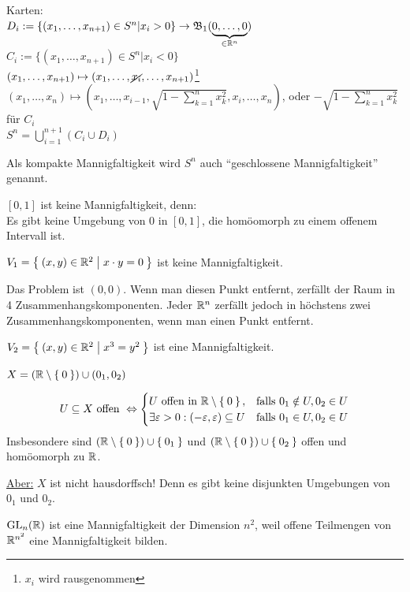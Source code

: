 \begin{beispiel}[Mannigfaltigkeiten]
\begin{bspenum}
              Karten: \\
              $D_i := \{(x_1, \dots, x_{n+1}) \in S^n | x_i > 0\} \rightarrow \mathfrak{B}_1 (\underbrace{0, \dots, 0}_{\in \mathbb{R}^n})$\\
              $C_i := \{(x_1, \dots, x_{n+1}) \in S^n | x_i < 0\}$\\
              $(x_1, \dots, x_{n+1}) \mapsto (x_1, \dots, \cancel{x_i}, \dots, x_{n+1})$\footnote{$x_i$ wird rausgenommen}\\
              $(x_1, \dots, x_{n}) \mapsto (x_1, \dots, x_{i-1}, \sqrt{1-\sum_{k=1}^n x_k^2}, x_i, \dots, x_n)$, oder $-\sqrt{1-\sum_{k=1}^n x_k^2}$ für $C_i$\\
              $S^n = \bigcup_{i=1}^{n+1} (C_i \cup D_i)$

              Als kompakte Mannigfaltigkeit wird $S^n$ auch \enquote{geschlossene Mannigfaltigkeit} genannt.
        \item $[0,1]$ ist keine Mannigfaltigkeit, denn:\\
              Es gibt keine Umgebung von $0$ in $[0,1]$, die homöomorph
              zu einem offenem Intervall ist.
        \item $V_1 = \Set{(x,y) \in \ensuremath{\mathbb{R}}^2 | x \cdot y = 0}$ ist
              keine Mannigfaltigkeit. 

              Das Problem ist $(0,0)$. Wenn man diesen Punkt entfernt,
              zerfällt der Raum in 4 Zusammenhangskomponenten.
              Jeder $\mathbb{R}^n$ zerfällt jedoch in höchstens zwei
              Zusammenhangskomponenten, wenn man einen Punkt entfernt.
        \item $V_2 = \Set{(x,y) \in \ensuremath{\mathbb{R}}^2 | x^3 = y^2}$ ist eine
              Mannigfaltigkeit.
        \item $X = (\mathbb{R} \setminus \Set{0}) \cup (0_1, 0_2)$ \label{bsp:mannigfaltigkeit8}

              \[U \subseteq X \text{ offen } \Leftrightarrow 
                \begin{cases}
                    U \text{ offen in } \mathbb{R} \setminus \Set{0}, &\text{falls } 0_1 \notin U, 0_2 \in U\\
                    \exists \varepsilon > 0: (-\varepsilon, \varepsilon) \subseteq U &\text{falls } 0_1 \in U, 0_2 \in U
                \end{cases}\]
              Insbesondere sind $(\mathbb{R} \setminus \Set{0}) \cup \Set{0_1}$
              und $(\mathbb{R} \setminus \Set{0}) \cup \Set{0_2}$ offen und
              homöomorph zu $\mathbb{R}$.

              \underline{Aber:} $X$ ist nicht hausdorffsch!
              Denn es gibt keine disjunkten Umgebungen von $0_1$ und
              $0_2$.
        \item \label{bsp:gln-ist-mf}$\mathrm{GL}_n(\mathbb{R})$ ist eine Mannigfaltigkeit der Dimension 
              $n^2$, weil offene Teilmengen von $\mathbb{R}^{n^2}$ eine
              Mannigfaltigkeit bilden.
    \end{bspenum}
\end{beispiel}


